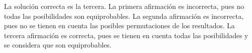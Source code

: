 \begin{solution}
  La solución correcta es la tercera. La primera afirmación es incorrecta,
  pues no todas las posibilidades son equiprobables. La segunda afirmación
  es incorrecta, pues no se tienen en cuenta las posibles permutaciones de
  los resultados. La tercera afirmación es correcta, pues se tienen en
  cuenta todas las posibilidades y se considera que son equiprobables.
\end{solution}
